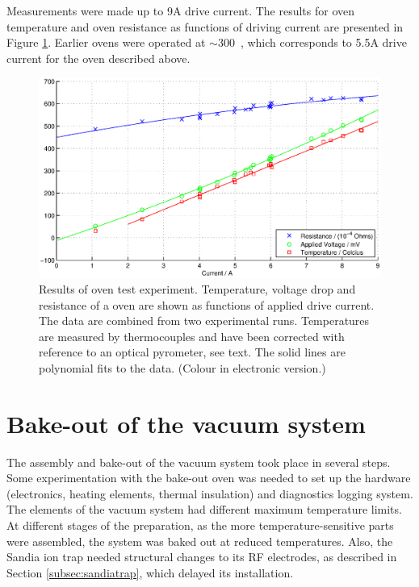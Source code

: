 Measurements were made up to 9A drive current. The results for oven temperature and oven resistance as functions of driving current are presented in Figure \ref{oventemp}. Earlier ovens were operated at $\sim$300\degC\, \cite{Lucas2004}, which corresponds to 5.5A drive current for the oven described above.


\begin{figure}[t]
\centering
\includegraphics[width=15cm]{chapter5/oventest/oventest_v2}
\caption[Pyrometric oven temperature measurements]{Results of \CaI{} oven test experiment. Temperature, voltage drop and resistance of a \CaI{} oven are shown as functions of applied drive current. The data are combined from two experimental runs. Temperatures are measured by thermocouples and have been corrected with reference to an optical pyrometer, see text. The solid lines are polynomial fits to the data.  (Colour in electronic version.)}
\label{oventemp}
\end{figure} 


\section{Bake-out of the vacuum system}

The assembly and bake-out of the vacuum system took place in several steps. Some experimentation with the bake-out oven was needed to set up the hardware (electronics, heating elements, thermal insulation) and diagnostics logging system.  The elements of the vacuum system had different maximum temperature limits. At different stages of the preparation, as the more temperature-sensitive parts were assembled, the system was baked out at reduced temperatures.  Also, the Sandia ion trap needed structural changes to its RF electrodes, as described in Section \ref{subsec:sandiatrap}, which delayed its installation.

